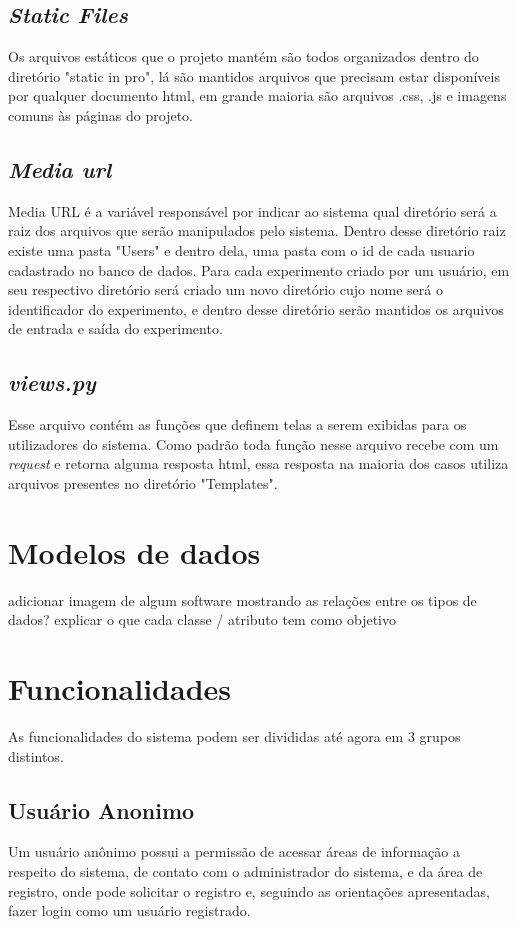 \documentclass[tg]{mdtufsm}
\begin{document}
\subsection{\emph{Static Files}}
Os arquivos estáticos que o projeto mantém são todos organizados dentro do diretório "static in pro", lá são mantidos arquivos que precisam estar disponíveis por qualquer documento html, em grande maioria são arquivos .css, .js e imagens comuns às páginas do projeto.
\subsection{\emph{Media url}}
Media URL é a variável responsável por indicar ao sistema qual diretório será a raiz dos arquivos que serão manipulados pelo sistema. Dentro desse diretório raiz existe uma pasta "Users" e dentro dela, uma pasta com o id de cada usuario cadastrado no banco de dados. Para cada experimento criado por um usuário, em seu respectivo diretório será criado um novo diretório cujo nome será o identificador do experimento, e dentro desse diretório serão mantidos os arquivos de entrada e saída do experimento.
\subsection{\emph{views.py}}
Esse arquivo contém as funções que definem telas a serem exibidas para os utilizadores do sistema. Como padrão toda função nesse arquivo recebe com um \emph{request} e retorna alguma resposta html, essa resposta na maioria dos casos utiliza arquivos presentes no diretório "Templates".
\section{Modelos de dados}
adicionar imagem de algum software mostrando as relações entre os tipos de dados?
explicar o que cada classe / atributo tem como objetivo
\section{Funcionalidades}
As funcionalidades do sistema podem ser divididas até agora em 3 grupos distintos.
\subsection{Usuário Anonimo}
Um usuário anônimo possui a permissão de acessar áreas de informação a respeito do sistema, de contato com o administrador do sistema, e da área de registro, onde pode solicitar o registro e, seguindo as orientações apresentadas, fazer login como um usuário registrado.
\end{document}
